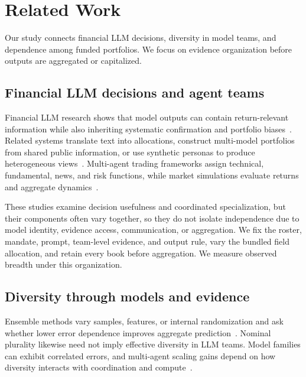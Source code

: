 \documentclass[sigconf]{acmart}
\begin{document}
\section{Related Work}
Our study connects financial LLM decisions, diversity in model teams, and dependence among funded portfolios. We focus on evidence organization before outputs are aggregated or capitalized.

\subsection{Financial LLM decisions and agent teams}
Financial LLM research shows that model outputs can contain return-relevant information while also inheriting systematic confirmation and portfolio biases~\cite{lopezlira2023chatgpt,lee2025yourai,winder2025biasedechoes}. Related systems translate text into allocations, construct multi-model portfolios from shared public information, or use synthetic personas to produce heterogeneous views~\cite{oh2025democratizing,iadisernia2025prompting}. Multi-agent trading frameworks assign technical, fundamental, news, and risk functions, while market simulations evaluate returns and aggregate dynamics~\cite{xiao2024tradingagents,miyazaki2026expertteams,wang2026macroeconomists,lopezlira2025market}.

These studies examine decision usefulness and coordinated specialization, but their components often vary together, so they do not isolate independence due to model identity, evidence access, communication, or aggregation. We fix the roster, mandate, prompt, team-level evidence, and output rule, vary the bundled field allocation, and retain every book before aggregation. We measure observed breadth under this organization.

\subsection{Diversity through models and evidence}
Ensemble methods vary samples, features, or internal randomization and ask whether lower error dependence improves aggregate prediction~\cite{brown2005diversity,ho1998random}. Nominal plurality likewise need not imply effective diversity in LLM teams. Model families can exhibit correlated errors, and multi-agent scaling gains depend on how diversity interacts with coordination and compute~\cite{kim2025correlated,yang2026agentscaling,wunderlich2026pareto}.


\end{document}
